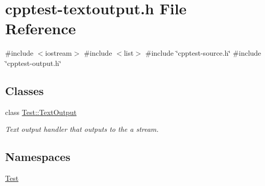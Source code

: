 \hypertarget{cpptest-textoutput_8h}{}\section{cpptest-\/textoutput.h File Reference}
\label{cpptest-textoutput_8h}
{\ttfamily \#include $<$iostream$>$}\newline
{\ttfamily \#include $<$list$>$}\newline
{\ttfamily \#include \char`\"{}cpptest-\/source.\+h\char`\"{}}\newline
{\ttfamily \#include \char`\"{}cpptest-\/output.\+h\char`\"{}}\newline
\subsection*{Classes}
\begin{DoxyCompactItemize}
\item 
class \mbox{\hyperlink{class_test_1_1_text_output}{Test\+::\+Text\+Output}}
\begin{DoxyCompactList}\small\item\em Text output handler that outputs to the a stream. \end{DoxyCompactList}\end{DoxyCompactItemize}
\subsection*{Namespaces}
\begin{DoxyCompactItemize}
\item 
 \mbox{\hyperlink{namespace_test}{Test}}
\end{DoxyCompactItemize}

